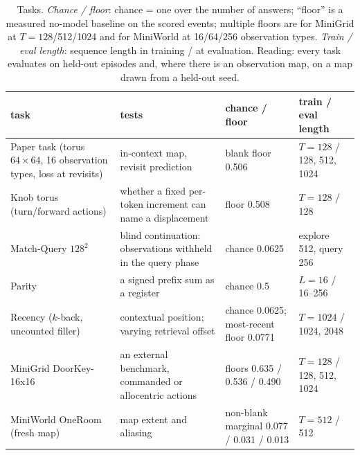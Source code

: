 \documentclass[10pt]{article}
\begin{document}
\begin{table}[t]
\centering
\small
\captionsetup{font=footnotesize,skip=4pt}
\caption{Tasks. \emph{Chance / floor}: chance = one over the number of answers; ``floor'' is a measured no-model baseline on the scored events; multiple floors are for MiniGrid at $T=128$/512/1024 and for MiniWorld at 16/64/256 observation types. \emph{Train / eval length}: sequence length in training / at evaluation. Reading: every task evaluates on held-out episodes and, where there is an observation map, on a map drawn from a held-out seed.}
\label{tab:tasks}
\begin{tabular}{@{}>{\raggedright\arraybackslash}p{4.1cm}>{\raggedright\arraybackslash}p{4.6cm}>{\raggedright\arraybackslash}p{3.0cm}>{\raggedright\arraybackslash}p{2.2cm}@{}}
\toprule
task & tests & chance / floor & train / eval length \\
\midrule
Paper task (torus $64\times64$, 16 observation types, loss at revisits) & in-context map, revisit prediction & blank floor 0.506 & $T=128$ / 128, 512, 1024 \\
Knob torus (turn/forward actions) & whether a fixed per-token increment can name a displacement & floor 0.508 & $T=128$ / 128 \\
Match-Query $128^2$ & blind continuation: observations withheld in the query phase & chance 0.0625 & explore 512, query 256 \\
Parity & a signed prefix sum as a register & chance 0.5 & $L=16$ / 16--256 \\
Recency ($k$-back, uncounted filler) & contextual position; varying retrieval offset & chance 0.0625; most-recent floor 0.0771 & $T=1024$ / 1024, 2048 \\
MiniGrid DoorKey-16x16 & an external benchmark, commanded or allocentric actions & floors 0.635 / 0.536 / 0.490 & $T=128$ / 128, 512, 1024 \\
MiniWorld OneRoom (fresh map) & map extent and aliasing & non-blank marginal 0.077 / 0.031 / 0.013 & $T=512$ / 512 \\
\bottomrule
\end{tabular}
\end{table}
\end{document}
